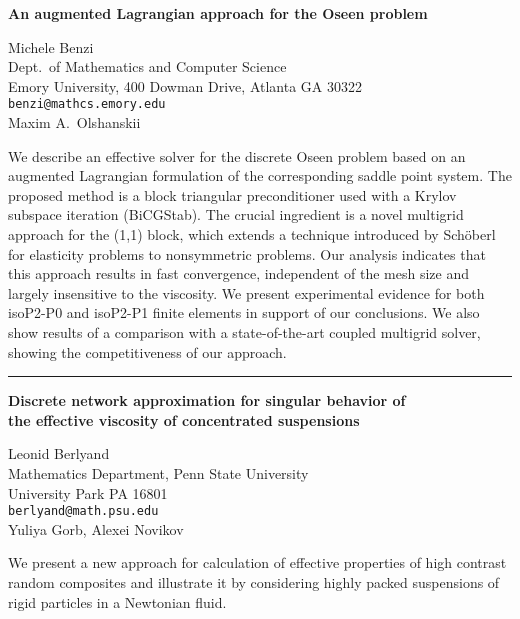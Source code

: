 \documentclass[twosided]{report}
\begin{document}
\begin{center}
{\large			%
{\bf An augmented Lagrangian approach for the Oseen problem}}

	Michele Benzi \\
	Dept.~of Mathematics and Computer Science \\
	Emory University, 400 Dowman Drive, Atlanta GA 30322 \\
	{\tt benzi@mathcs.emory.edu} \\
	Maxim A.~Olshanskii
\end{center}
We describe an effective solver for the discrete Oseen
problem based on an augmented Lagrangian formulation of the
corresponding saddle point system. The proposed method is a
block triangular preconditioner used with a Krylov subspace
iteration (BiCGStab). The crucial ingredient is a novel
multigrid approach for the (1,1) block, which extends a
technique introduced by Sch\"oberl for elasticity problems
to nonsymmetric problems. Our analysis indicates that this
approach results in fast convergence, independent of the
mesh size and largely insensitive to the viscosity. We
present experimental evidence for both isoP2-P0 and isoP2-P1
finite elements in support of our conclusions. We also show
results of a comparison with a state-of-the-art coupled
multigrid solver, showing the competitiveness of our
approach.




	\begin{center} \rule{6in}{1pt} \end{center}

\begin{center}
{\large			%
{\bf Discrete network approximation for singular behavior of \\
the effective viscosity of concentrated suspensions}}

	Leonid Berlyand \\
	Mathematics Department, Penn State University \\
	University Park  PA 16801  \\
	{\tt berlyand@math.psu.edu} \\
	Yuliya Gorb, Alexei Novikov
\end{center}
We present a new approach for calculation of effective
properties of high contrast random composites and illustrate
it by considering highly packed suspensions of rigid
particles in a Newtonian fluid.
\end{document}
